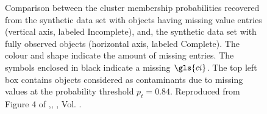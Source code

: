 \begin{figure}[!htp]
\begin{center}
\caption{Comparison between the cluster membership probabilities recovered from the synthetic data set with objects having missing value entries (vertical axis, labeled Incomplete), and, the synthetic data set with fully observed objects (horizontal axis, labeled Complete). The colour and shape indicate the amount of missing entries. The symbols enclosed in black indicate a missing $\gls{ci}$. The top left box contains objects considered as contaminants due to missing values at the probability threshold $p_t=0.84$. Reproduced from Figure 4 of \citet{Olivares2017},\textit{}, , Vol. .}
\label{figure:IncVsCom}
\end{center}
\end{figure}

